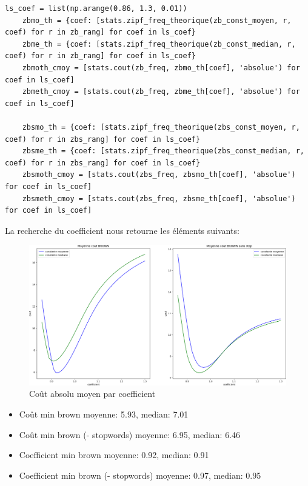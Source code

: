 \documentclass[a4paper,12pt]{article}
\begin{document}
			\begin{lstlisting}[title=Calcul des fréquences par coefficient]
    ls_coef = list(np.arange(0.86, 1.3, 0.01))
    zbmo_th = {coef: [stats.zipf_freq_theorique(zb_const_moyen, r, coef) for r in zb_rang] for coef in ls_coef}
    zbme_th = {coef: [stats.zipf_freq_theorique(zb_const_median, r, coef) for r in zb_rang] for coef in ls_coef}
    zbmoth_cmoy = [stats.cout(zb_freq, zbmo_th[coef], 'absolue') for coef in ls_coef]
    zbmeth_cmoy = [stats.cout(zb_freq, zbme_th[coef], 'absolue') for coef in ls_coef]

    zbsmo_th = {coef: [stats.zipf_freq_theorique(zbs_const_moyen, r, coef) for r in zbs_rang] for coef in ls_coef}
    zbsme_th = {coef: [stats.zipf_freq_theorique(zbs_const_median, r, coef) for r in zbs_rang] for coef in ls_coef}
    zbsmoth_cmoy = [stats.cout(zbs_freq, zbsmo_th[coef], 'absolue') for coef in ls_coef]
    zbsmeth_cmoy = [stats.cout(zbs_freq, zbsme_th[coef], 'absolue') for coef in ls_coef] \end{lstlisting}
		
		La recherche du coefficient nous retourne les éléments suivants:
			\begin{figure}[H]
				\includegraphics[width=\linewidth]{img/coutZipf.png}
				\caption{Coût absolu moyen par coefficient}
			\end{figure}
		
			\begin{itemize}
				\item Coût min brown moyenne: 5.93, median: 7.01
				\item Coût min brown (- stopwords) moyenne: 6.95, median: 6.46
				\item Coefficient min brown moyenne: 0.92, median: 0.91
				\item Coefficient min brown (- stopwords) moyenne: 0.97, median: 0.95
			\end{itemize}
				
\end{document}
